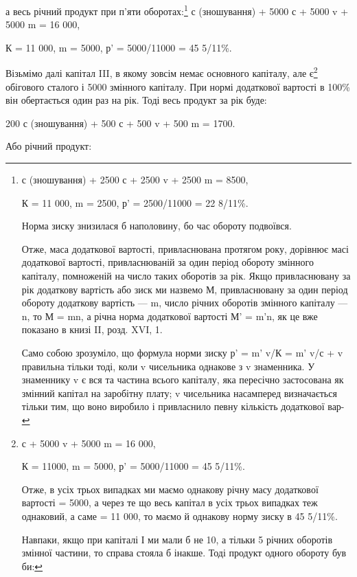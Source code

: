 а весь річний продукт при п’яти оборотах:\footnote{
с (зношування) + 2500 с + 2500 v + 2500 m = 8500,

К = 11 000, m = 2500, р' = 2500/11000 = 22 8/11\%.

Норма зиску знизилася б наполовину, бо час обороту подвоївся.

Отже, маса додаткової вартості, привласнювана протягом року,
дорівнює масі додаткової вартості, привласнюваній за один період
обороту змінного капіталу, помноженій на число таких оборотів
за рік. Якщо привласнювану за рік додаткову вартість або зиск
ми назвемо М, привласнювану за один період обороту додаткову
вартість — m, число річних оборотів змінного капіталу — n, то
М = mn, а річна норма додаткової вартості М' = m'n, як це
вже показано в книзі II, розд. XVI, 1.

Само собою зрозуміло, що формула норми зиску р' = m' v/К =
m' v/с + v правильна тільки тоді, коли v чисельника однакове
з v знаменника. У знаменнику v є вся та частина всього капіталу,
яка пересічно застосована як змінний капітал на заробітну
плату; v чисельника насамперед визначається тільки тим, що
воно виробило і привласнило певну кількість додаткової вар-
} с (зношування) + 5000 с + 5000 v + 5000 m = 16 000,

К = 11 000, m = 5000, р' = 5000/11000 = 45 5/11\%.

Візьмімо далі капітал III, в якому зовсім немає основного капіталу,
але є\footnote{
с + 5000 v + 5000 m = 16 000,

К = 11000, m = 5000, р' = 5000/11000 = 45 5/11\%.

Отже, в усіх трьох випадках ми маємо однакову річну масу
додаткової вартості = 5000, а через те що весь капітал в усіх
трьох випадках теж однаковий, а саме = 11 000, то маємо
й однакову норму зиску в 45 5/11\%.

Навпаки, якщо при капіталі І ми мали б не 10, а тільки
5 річних оборотів змінної частини, то справа стояла б інакше.
Тоді продукт одного обороту був би:
} обігового сталого і 5000 змінного капіталу.
При нормі додаткової вартості в 100\% він обертається один раз
на рік. Тоді весь продукт за рік буде:

200 с (зношування) + 500 с + 500 v + 500 m = 1700.

Або річний продукт: